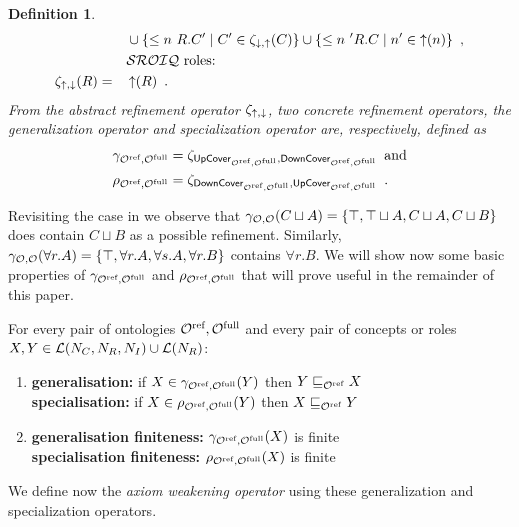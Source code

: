 \documentclass[
]{ceurart}
\newtheorem{definition}{Definition}
\begin{document}
\begin{definition}
{\begin{alignat*}{2}
    &&& \cup \{ \less n R.C' \mid C' \in \zeta_{\corefine,\refine}(C) \}
    \cup \{ \less n' R.C \mid n' \in \refine(n) \} \enspace, \\
    &&& \text{\SROIQ roles:} \\
    \zeta_{\refine,\corefine}(R) &= &&\refine(R) \enspace.
  \end{alignat*}
  }
  From the abstract refinement operator $\zeta_{\mathop{\uparrow},\mathop{\downarrow}}$, two concrete refinement operators, the \emph{generalization operator} and \emph{specialization operator} are, respectively, defined as
  {\footnotesize
  \begin{align*}
    \gamma_{{\mathcal{O}^\textnormal{ref}},{\mathcal{O}^\textnormal{full}}} &= \zeta_{{\mathsf{UpCover}}_{{\mathcal{O}^\textnormal{ref}},{\mathcal{O}^\textnormal{full}}},{\mathsf{DownCover}}_{{\mathcal{O}^\textnormal{ref}},{\mathcal{O}^\textnormal{full}}}} \enspace \text{and} \\
    \rho_{{\mathcal{O}^\textnormal{ref}},{\mathcal{O}^\textnormal{full}}} &= \zeta_{{\mathsf{DownCover}}_{{\mathcal{O}^\textnormal{ref}},{\mathcal{O}^\textnormal{full}}},{\mathsf{UpCover}}_{{\mathcal{O}^\textnormal{ref}},{\mathcal{O}^\textnormal{full}}}} \enspace.
  \end{align*}
  }
\end{definition}

Revisiting the case in  we observe that $\gamma_{\mathcal{O},\mathcal{O}}(C \sqcup A) = \{ \top, \top \sqcup A, C \sqcup A, C \sqcup B \}$ does contain $C \sqcup B$ as a possible refinement. Similarly, $\gamma_{\mathcal{O},\mathcal{O}}(\forall r.A) = \{ \top, \forall r.A, \forall s.A, \forall r.B \}$ contains $\forall r.B$. We will show now some basic properties of $\gamma_{{\mathcal{O}^\textnormal{ref}},{\mathcal{O}^\textnormal{full}}}$ and $\rho_{{\mathcal{O}^\textnormal{ref}},{\mathcal{O}^\textnormal{full}}}$ that will prove useful in the remainder of this paper.

\begin{lemma}\label{lem:basic}
  For every pair of \SROIQ ontologies ${\mathcal{O}^\textnormal{ref}}, {\mathcal{O}^\textnormal{full}}$ and every pair of concepts or roles $X, Y \in \mathcal{L}(N_C, N_R, N_I) \cup \mathcal{L}(N_R)$:
  \newcommand\litem[1]{\item{\bfseries #1:\enspace }}
  \begin{enumerate}
    \litem{generalisation}\label{lem:generalisation} if $X \in \gamma_{{\mathcal{O}^\textnormal{ref}},{\mathcal{O}^\textnormal{full}}}(Y)$ then $Y \sqsubseteq_{{\mathcal{O}^\textnormal{ref}}} X$ \\
    \textbf{specialisation:\enspace} if $X \in \rho_{{\mathcal{O}^\textnormal{ref}},{\mathcal{O}^\textnormal{full}}}(Y)$ then $X \sqsubseteq_{{\mathcal{O}^\textnormal{ref}}} Y$
    \litem{generalisation finiteness} $\gamma_{{\mathcal{O}^\textnormal{ref}},{\mathcal{O}^\textnormal{full}}}(X)$ is finite \\
    \textbf{specialisation finiteness:\enspace} $\rho_{{\mathcal{O}^\textnormal{ref}},{\mathcal{O}^\textnormal{full}}}(X)$ is finite
  \end{enumerate}
\end{lemma}

We define now the \emph{axiom weakening operator} using these generalization and specialization operators.
\end{document}
